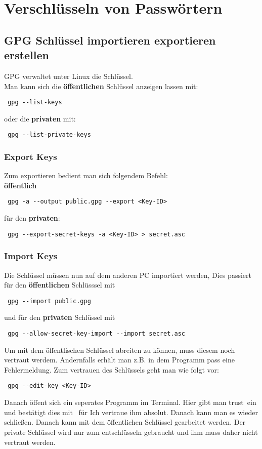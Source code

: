 \documentclass[11pt,fleqn]{book} %
\numberwithin{equation}{section} %
\numberwithin{figure}{section} %
\numberwithin{table}{section} %
\begin{document}
\chapter{Verschlüsseln von Passwörtern}
\section{GPG Schlüssel importieren exportieren erstellen}
GPG verwaltet unter Linux die Schlüssel.\\
Man kann sich die \textbf{öffentlichen} Schlüssel anzeigen lassen mit:
\begin{lstlisting}
 gpg --list-keys
\end{lstlisting}
oder die \textbf{privaten} mit:
\begin{lstlisting}
 gpg --list-private-keys
\end{lstlisting}
\subsection{Export Keys}
Zum exportieren bedient man sich folgendem Befehl:\\
\textbf{öffentlich}
\begin{lstlisting}
 gpg -a --output public.gpg --export <Key-ID>
\end{lstlisting}
für den \textbf{privaten}:
\begin{lstlisting}
 gpg --export-secret-keys -a <Key-ID> > secret.asc
\end{lstlisting}
\subsection{Import Keys}
Die Schlüssel müssen nun auf dem anderen PC importiert werden, Dies passiert für den \textbf{öffentlichen} Schlüsssel mit
\begin{lstlisting}
 gpg --import public.gpg
\end{lstlisting}
und für den \textbf{privaten} Schlüssel mit
\begin{lstlisting}
 gpg --allow-secret-key-import --import secret.asc
\end{lstlisting}
Um mit dem öffentlischen Schlüssel abreiten zu können, muss diesem noch vertraut werdem. Andernfalls erhält man z.B. in dem Programm pass eine Fehlermeldung. Zum vertrauen des Schlüssels geht man wie folgt vor:
\begin{lstlisting}
 gpg --edit-key <Key-ID>
\end{lstlisting}
Danach öffent sich ein seperates Programm im Terminal. Hier gibt man \glqq trust\grqq \ ein und bestätigt dies mit  \grqq \ für \glqq Ich vertraue ihm absolut\grqq. Danach kann man es wieder schließen. Danach kann mit dem öffentlichen Schlüssel gearbeitet werden. Der private Schlüssel wird nur zum entschlüsseln gebraucht und ihm muss daher nicht vertraut werden.
\end{document}
